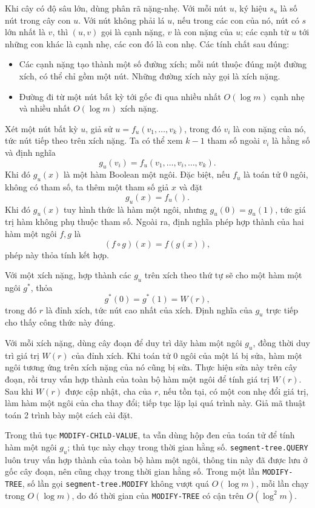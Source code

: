 \documentclass[11pt]{article}
\begin{document}
Khi cây có độ sâu lớn, dùng phân rã nặng-nhẹ. Với mỗi nút \(u\), ký hiệu \(s_u\)
là số nút trong cây con \(u\). Với nút không phải lá \(u\), nếu trong các con
của nó, nút có \(s\) lớn nhất là \(v\), thì \((u,v)\) gọi là cạnh nặng, \(v\)
là con nặng của \(u\); các cạnh từ \(u\) tới những con khác là cạnh nhẹ, các
con đó là con nhẹ. Các tính chất sau đúng:

\begin{itemize}
  \item Các cạnh nặng tạo thành một số đường xích; mỗi nút thuộc đúng một đường
  xích, có thể chỉ gồm một nút. Những đường xích này gọi là xích nặng.
  \item Đường đi từ một nút bất kỳ tới gốc đi qua nhiều nhất \(O(\log m)\) cạnh
  nhẹ và nhiều nhất \(O(\log m)\) xích nặng.
\end{itemize}

Xét một nút bất kỳ \(u\), giả sử \(u=f_u(v_1,\ldots,v_k)\), trong đó \(v_i\) là
con nặng của nó, tức nút tiếp theo trên xích nặng. Ta có thể xem \(k-1\) tham
số ngoài \(v_i\) là hằng số và định nghĩa
\[
  g_u(v_i)=f_u(v_1,\ldots,v_i,\ldots,v_k).
\]
Khi đó \(g_u(x)\) là một hàm Boolean một ngôi. Đặc biệt, nếu \(f_u\) là toán tử
\(0\) ngôi, không có tham số, ta thêm một tham số giả \(x\) và đặt
\[
  g_u(x)=f_u().
\]
Khi đó \(g_u(x)\) tuy hình thức là hàm một ngôi, nhưng \(g_u(0)=g_u(1)\), tức
giá trị hàm không phụ thuộc tham số. Ngoài ra, định nghĩa phép hợp thành của
hai hàm một ngôi \(f,g\) là
\[
  (f\circ g)(x)=f(g(x)),
\]
phép này thỏa tính kết hợp.

Với một xích nặng, hợp thành các \(g_u\) trên xích theo thứ tự sẽ cho một hàm
một ngôi \(g^*\), thỏa
\[
  g^*(0)=g^*(1)=W(r),
\]
trong đó \(r\) là đỉnh xích, tức nút cao nhất của xích. Định nghĩa của \(g_u\)
trực tiếp cho thấy công thức này đúng.

Với mỗi xích nặng, dùng cây đoạn để duy trì dãy hàm một ngôi \(g_u\), đồng thời
duy trì giá trị \(W(r)\) của đỉnh xích. Khi toán tử \(0\) ngôi của một lá bị
sửa, hàm một ngôi tương ứng trên xích nặng của nó cũng bị sửa. Thực hiện sửa
này trên cây đoạn, rồi truy vấn hợp thành của toàn bộ hàm một ngôi để tính
giá trị \(W(r)\). Sau khi \(W(r)\) được cập nhật, cha của \(r\), nếu tồn tại,
có một con nhẹ đổi giá trị, làm hàm một ngôi của cha thay đổi; tiếp tục lặp lại
quá trình này. Giả mã thuật toán 2 trình bày một cách cài đặt.

Trong thủ tục \texttt{MODIFY-CHILD-VALUE}, ta vẫn dùng hộp đen của toán tử để
tính hàm một ngôi \(g_u\); thủ tục này chạy trong thời gian hằng số.
\texttt{segment-tree.QUERY} luôn truy vấn hợp thành của toàn bộ hàm một ngôi,
thông tin này đã được lưu ở gốc cây đoạn, nên cũng chạy trong thời gian hằng
số. Trong một lần \texttt{MODIFY-TREE}, số lần gọi
\texttt{segment-tree.MODIFY} không vượt quá \(O(\log m)\), mỗi lần chạy trong
\(O(\log m)\), do đó thời gian của \texttt{MODIFY-TREE} có cận trên
\(O(\log^2 m)\).
\end{document}
